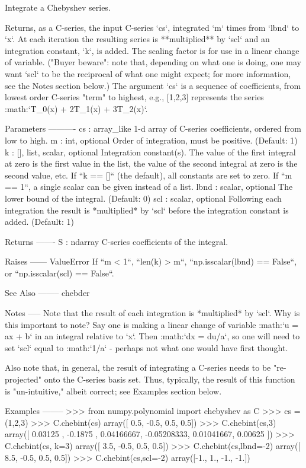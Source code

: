 \begin{DoxyVerb}Integrate a Chebyshev series.

Returns, as a C-series, the input C-series `cs`, integrated `m` times
from `lbnd` to `x`.  At each iteration the resulting series is
**multiplied** by `scl` and an integration constant, `k`, is added.
The scaling factor is for use in a linear change of variable.  ("Buyer
beware": note that, depending on what one is doing, one may want `scl`
to be the reciprocal of what one might expect; for more information,
see the Notes section below.)  The argument `cs` is a sequence of
coefficients, from lowest order C-series "term" to highest, e.g.,
[1,2,3] represents the series :math:`T_0(x) + 2T_1(x) + 3T_2(x)`.

Parameters
----------
cs : array_like
    1-d array of C-series coefficients, ordered from low to high.
m : int, optional
    Order of integration, must be positive. (Default: 1)
k : {[], list, scalar}, optional
    Integration constant(s).  The value of the first integral at zero
    is the first value in the list, the value of the second integral
    at zero is the second value, etc.  If ``k == []`` (the default),
    all constants are set to zero.  If ``m == 1``, a single scalar can
    be given instead of a list.
lbnd : scalar, optional
    The lower bound of the integral. (Default: 0)
scl : scalar, optional
    Following each integration the result is *multiplied* by `scl`
    before the integration constant is added. (Default: 1)

Returns
-------
S : ndarray
    C-series coefficients of the integral.

Raises
------
ValueError
    If ``m < 1``, ``len(k) > m``, ``np.isscalar(lbnd) == False``, or
    ``np.isscalar(scl) == False``.

See Also
--------
chebder

Notes
-----
Note that the result of each integration is *multiplied* by `scl`.
Why is this important to note?  Say one is making a linear change of
variable :math:`u = ax + b` in an integral relative to `x`.  Then
:math:`dx = du/a`, so one will need to set `scl` equal to :math:`1/a`
- perhaps not what one would have first thought.

Also note that, in general, the result of integrating a C-series needs
to be "re-projected" onto the C-series basis set.  Thus, typically,
the result of this function is "un-intuitive," albeit correct; see
Examples section below.

Examples
--------
>>> from numpy.polynomial import chebyshev as C
>>> cs = (1,2,3)
>>> C.chebint(cs)
array([ 0.5, -0.5,  0.5,  0.5])
>>> C.chebint(cs,3)
array([ 0.03125   , -0.1875    ,  0.04166667, -0.05208333,  0.01041667,
        0.00625   ])
>>> C.chebint(cs, k=3)
array([ 3.5, -0.5,  0.5,  0.5])
>>> C.chebint(cs,lbnd=-2)
array([ 8.5, -0.5,  0.5,  0.5])
>>> C.chebint(cs,scl=-2)
array([-1.,  1., -1., -1.])\end{DoxyVerb}
